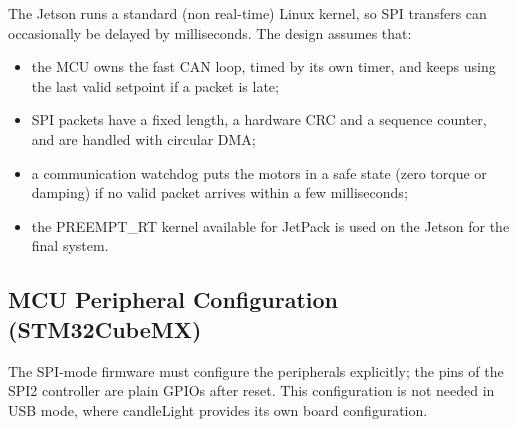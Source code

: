 \documentclass[11pt,a4paper]{article}
\begin{document}
The Jetson runs a standard (non real-time) Linux kernel, so SPI transfers can occasionally be
delayed by milliseconds. The design assumes that:
\begin{itemize}
    \item the MCU owns the fast CAN loop, timed by its own timer, and keeps using the last valid
    setpoint if a packet is late;
    \item SPI packets have a fixed length, a hardware CRC and a sequence counter, and are handled
    with circular DMA;
    \item a communication watchdog puts the motors in a safe state (zero torque or damping) if no
    valid packet arrives within a few milliseconds;
    \item the PREEMPT\_RT kernel available for JetPack is used on the Jetson for the final system.
\end{itemize}

\subsection{MCU Peripheral Configuration (STM32CubeMX)}\label{sec:cubemx}

The SPI-mode firmware must configure the peripherals explicitly; the pins of the SPI2 controller
are plain GPIOs after reset. This configuration is not needed in USB mode, where candleLight
provides its own board configuration.
\end{document}
